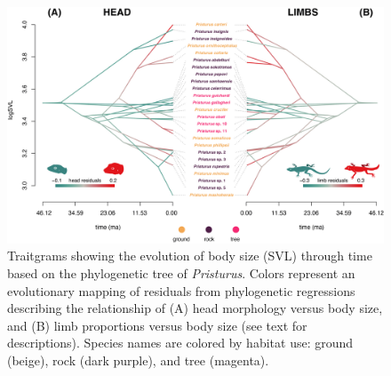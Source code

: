 \documentclass[
  11pt,
]{article}
\begin{document}
\newpage

\begin{figure}

{\centering \includegraphics[width=1\linewidth]{Figs/figure_3_Pristurus_allometry_traitgram_legends} 

}

\caption{Traitgrams showing the evolution of body size (SVL) through time based on the phylogenetic tree of \textit{Pristurus}. Colors represent an evolutionary mapping of residuals from phylogenetic regressions describing the relationship of (A) head morphology versus body size, and (B) limb proportions versus body size (see text for descriptions). Species names are colored by habitat use: ground (beige), rock (dark purple), and tree (magenta).}\label{fig:unnamed-chunk-6}
\end{figure}

\newpage
\end{document}

